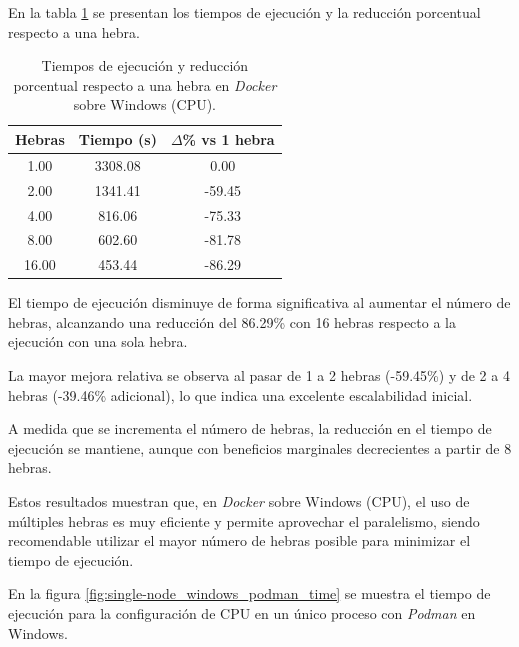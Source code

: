 En la tabla \ref{tab:single-node_windows_docker_time} se presentan los tiempos de ejecución y la reducción porcentual respecto a una hebra.

\begin{table}[ht]
    \centering
    \begin{tabular}{|c|c|c|}
        \hline
        \textbf{Hebras} & \textbf{Tiempo (s)} & \textbf{$\Delta$\% vs 1 hebra} \\
        \hline
        1.00            & 3308.08             & 0.00                           \\
        2.00            & 1341.41             & -59.45                         \\
        4.00            & 816.06              & -75.33                         \\
        8.00            & 602.60              & -81.78                         \\
        16.00           & 453.44              & -86.29                         \\
        \hline
    \end{tabular}
    \caption{Tiempos de ejecución y reducción porcentual respecto a una hebra en \textit{Docker} sobre Windows (CPU).}
    \label{tab:single-node_windows_docker_time}
\end{table}

El tiempo de ejecución disminuye de forma significativa al aumentar el número de hebras, alcanzando una reducción del 86.29\% con 16 hebras respecto a la ejecución con una sola hebra.

La mayor mejora relativa se observa al pasar de 1 a 2 hebras (-59.45\%) y de 2 a 4 hebras (-39.46\% adicional), lo que indica una excelente escalabilidad inicial.

A medida que se incrementa el número de hebras, la reducción en el tiempo de ejecución se mantiene, aunque con beneficios marginales decrecientes a partir de 8 hebras.

Estos resultados muestran que, en \textit{Docker} sobre Windows (CPU), el uso de múltiples hebras es muy eficiente y permite aprovechar el paralelismo, siendo recomendable utilizar el mayor número de hebras posible para minimizar el tiempo de ejecución.

En la figura \ref{fig:single-node_windows_podman_time} se muestra el tiempo de ejecución para la configuración de CPU en un único proceso con \textit{Podman} en Windows.

